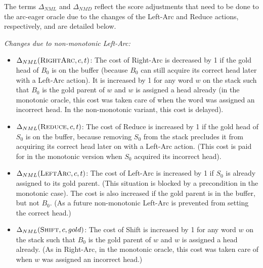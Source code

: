 \documentclass[11pt,letterpaper]{article}
\begin{document}
The terms $\Delta_{NML}$ and $\Delta_{NMD}$ reflect the score adjustments that
need to be done to the arc-eager oracle due to the changes of the Left-Arc and
Reduce actions, respectively, and are detailed below.

\noindent \emph{Changes due to non-monotonic Left-Arc:}

\begin{itemize}\addtolength{\itemsep}{-0.5\baselineskip}
   \item $\Delta_{NML}(\textsc{RightArc},c,t)$: The cost of Right-Arc is
      decreased by 1 if the gold head of $B_0$ is on the buffer
         (because $B_0$ can still acquire its correct head later with a Left-Arc action).
It is increased by 1 for any word $w$ on the stack such that $B_0$ is the gold
parent of $w$ and $w$ is assigned a head already (in the monotonic oracle,
this cost was taken care of when the word was assigned an incorrect head. In the
non-monotonic variant, this cost is delayed).

   \item $\Delta_{NML}(\textsc{Reduce},c,t)$: The cost of Reduce is increased
      by 1 if the gold head of $S_0$ is on the buffer,
because removing $S_0$ from the stack precludes it from acquiring its correct head later on with
a Left-Arc action. (This cost is paid for in the monotonic version when $S_0$
acquired its incorrect head).

   \item $\Delta_{NML}(\textsc{LeftArc},c,t)$: The cost of Left-Arc is increased by 1 if $S_0$ is already assigned to its gold
parent. (This situation is blocked by a precondition in the monotonic
case). The cost is also increased if the gold parent is in the buffer, but not
$B_0$. (As a future non-monotonic Left-Arc is prevented from setting
the correct head.)

  \item $\Delta_{NML}(\textsc{Shift},c,gold)$: The cost of Shift is increased
     by 1 for any word $w$ on the stack such that $B_0$ is the gold
parent of $w$ and $w$ is assigned a head already. (As in Right-Arc, in the monotonic oracle,
this cost was taken care of when $w$ was assigned an incorrect head.)
\end{itemize}
\end{document}
